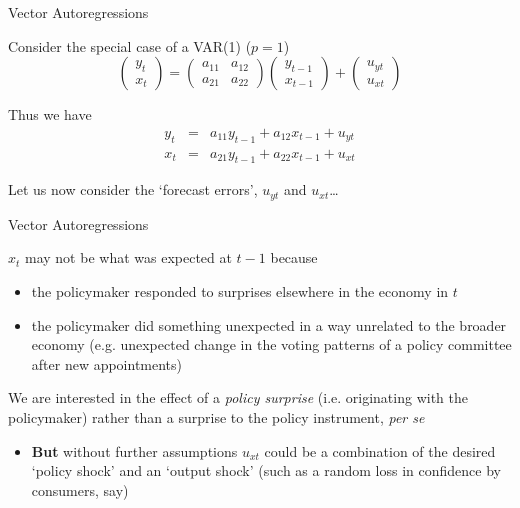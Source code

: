 
\begin{frame}{Vector Autoregressions}

Consider the special case of a VAR(1) ($p=1$)
\begin{equation*}
\begin{pmatrix}
y_{t} \\
x_{t}
\end{pmatrix}
=
\begin{pmatrix}
a_{11} 	& a_{12} \\
a_{21}	& a_{22}
\end{pmatrix}
\begin{pmatrix}
y_{t-1} \\
x_{t-1}
\end{pmatrix}
+
\begin{pmatrix}
u_{yt} \\
u_{xt}
\end{pmatrix}
\end{equation*}

Thus we have
\begin{eqnarray*}
y_{t} &=& a_{11} y_{t-1} + a_{12}x_{t-1} + u_{yt}	\\
x_{t} &=& a_{21} y_{t-1} + a_{22}x_{t-1} + u_{xt}
\end{eqnarray*}

Let us now consider the `forecast errors', $u_{yt}$ and $u_{xt}$\ldots

\end{frame}


\begin{frame}{Vector Autoregressions}

$x_{t}$ may not be what was expected at $t-1$ because 
\begin{itemize}
\item	the policymaker responded to surprises elsewhere in the economy in $t$
\item	the policymaker did something unexpected in a way unrelated to the broader economy (e.g. unexpected change in the voting patterns of a policy committee after new appointments)
\end{itemize}

\vspace{2mm}
We are interested in the effect of a \emph{policy surprise} (i.e. originating with the policymaker) rather than a surprise to the policy instrument, \emph{per se}
\begin{itemize}
\item	\textbf{But} without further assumptions $u_{xt}$ could be a combination of the desired `policy shock' and an `output shock' (such as a random loss in confidence by consumers, say)
\end{itemize}

\end{frame}

